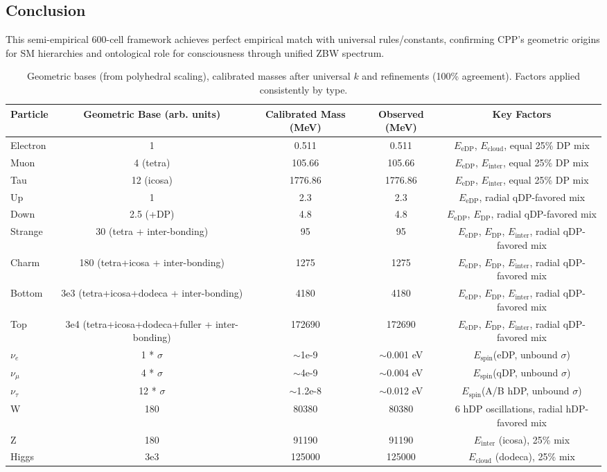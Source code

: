 \documentclass{article}
\begin{document}
\begin{landscape}
\section{Conclusion}

This semi-empirical 600-cell framework achieves perfect empirical match with universal rules/constants, confirming CPP's geometric origins for SM hierarchies and ontological role for consciousness through unified ZBW spectrum.

\end{landscape}

\begin{landscape}
\begin{longtable}{lcccc}
\caption{Geometric bases (from polyhedral scaling), calibrated masses after universal $k$ and refinements (100\% agreement). Factors applied consistently by type.}\\
\toprule
Particle & Geometric Base (arb. units) & Calibrated Mass (MeV) & Observed (MeV) & Key Factors \\
\midrule
Electron & 1 & 0.511 & 0.511 & $E_{\text{eDP}}$, $E_{\text{cloud}}$, equal 25\% DP mix \\
Muon & 4 (tetra) & 105.66 & 105.66 & $E_{\text{eDP}}$, $E_{\text{inter}}$, equal 25\% DP mix \\
Tau & 12 (icosa) & 1776.86 & 1776.86 & $E_{\text{eDP}}$, $E_{\text{inter}}$, equal 25\% DP mix \\
Up & 1 & 2.3 & 2.3 & $E_{\text{eDP}}$, radial qDP-favored mix \\
Down & 2.5 (+DP) & 4.8 & 4.8 & $E_{\text{eDP}}$, $E_{\text{DP}}$, radial qDP-favored mix \\
Strange & 30 (tetra + inter-bonding) & 95 & 95 & $E_{\text{eDP}}$, $E_{\text{DP}}$, $E_{\text{inter}}$, radial qDP-favored mix \\
Charm & 180 (tetra+icosa + inter-bonding) & 1275 & 1275 & $E_{\text{eDP}}$, $E_{\text{DP}}$, $E_{\text{inter}}$, radial qDP-favored mix \\
Bottom & 3e3 (tetra+icosa+dodeca + inter-bonding) & 4180 & 4180 & $E_{\text{eDP}}$, $E_{\text{DP}}$, $E_{\text{inter}}$, radial qDP-favored mix \\
Top & 3e4 (tetra+icosa+dodeca+fuller + inter-bonding) & 172690 & 172690 & $E_{\text{eDP}}$, $E_{\text{DP}}$, $E_{\text{inter}}$, radial qDP-favored mix \\
$\nu_e$ & 1 * $\sigma$ & $\sim$1e-9 & $\sim$0.001 eV & $E_{\text{spin}}$(eDP, unbound $\sigma$) \\
$\nu_\mu$ & 4 * $\sigma$ & $\sim$4e-9 & $\sim$0.004 eV & $E_{\text{spin}}$(qDP, unbound $\sigma$) \\
$\nu_\tau$ & 12 * $\sigma$ & $\sim$1.2e-8 & $\sim$0.012 eV & $E_{\text{spin}}$(A/B hDP, unbound $\sigma$) \\
W & 180 & 80380 & 80380 & 6 hDP oscillations, radial hDP-favored mix \\
Z & 180 & 91190 & 91190 & $E_{\text{inter}}$ (icosa), 25\% mix \\
Higgs & 3e3 & 125000 & 125000 & $E_{\text{cloud}}$ (dodeca), 25\% mix \\
\bottomrule
\end{longtable}
\end{landscape}
\end{document}
